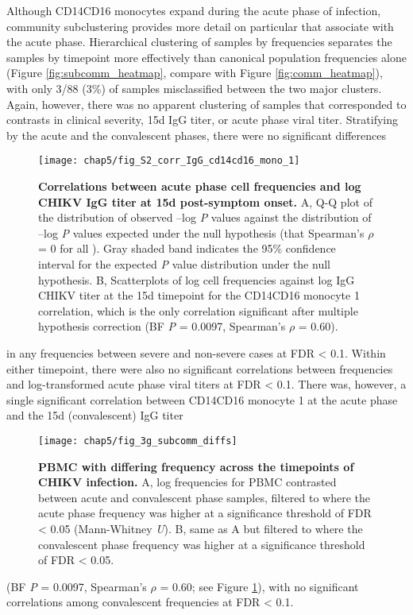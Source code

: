 Although CD14\sups{+}\allowbreak CD16\sups{+} monocytes expand during the acute phase of infection, community subclustering provides more detail on particular \subcommunities{} that associate with the acute phase. Hierarchical clustering of samples by \subcommunity{} frequencies separates the samples by timepoint more effectively than canonical population frequencies alone (Figure \ref{fig:subcomm_heatmap}, compare with Figure \ref{fig:comm_heatmap}), with only 3/88 (3\%) of samples misclassified between the two major clusters. Again, however, there was no apparent clustering of samples that corresponded to contrasts in clinical severity, 15d IgG titer, or acute phase viral titer. Stratifying by the acute and the convalescent phases, there were no significant differences
\begin{figure}[tb]
  \centering
  \texttt{[image: chap5/fig\_S2\_corr\_IgG\_cd14cd16\_mono\_1]}
  \caption[Correlations between acute phase cell \subcommunity{} frequencies and 15d CHIKV IgG titer]{
  \textbf{Correlations between acute phase cell \subcommunity{} frequencies and log CHIKV IgG titer at 15d post-symptom onset.} A, Q-Q plot of the distribution of observed –log \emph{P} values against the distribution of –log \emph{P} values expected under the null hypothesis (that Spearman’s $\rho$ = 0 for all \subcommunities). Gray shaded band indicates the 95\% confidence interval for the expected \emph{P} value distribution under the null hypothesis. B, Scatterplots of log cell \subcommunity{} frequencies against log IgG CHIKV titer at the 15d timepoint for the CD14\sups{+}CD16\sups{+} monocyte 1 correlation, which is the only correlation significant after multiple hypothesis correction (BF \emph{P} = 0.0097, Spearman’s $\rho$ = 0.60).
  }
  \label{fig:corr_cytof_igg}
\end{figure}
in any \subcommunity{} frequencies between severe and non-severe cases at FDR < 0.1. Within either timepoint, there were also no significant correlations between \subcommunity{} frequencies and log-transformed acute phase viral titers at FDR < 0.1. There was, however, a single significant correlation between CD14\sups{+}\allowbreak CD16\sups{+} monocyte \subcommunity{} 1 at the acute phase and the 15d (convalescent) IgG titer
\begin{figure*}[htb]
  \centering
  \texttt{[image: chap5/fig\_3g\_subcomm\_diffs]}
  \caption[PBMC \subcommunities{} with differing frequency across the CHIKV infection phases]{
  \textbf{PBMC \subcommunities{} with differing frequency across the timepoints of CHIKV infection.} A, log frequencies for PBMC \subcommunities{} contrasted between acute and convalescent phase samples, filtered to \subcommunities{} where the acute phase frequency was higher at a significance threshold of FDR < 0.05 (Mann-Whitney \emph{U}). B, same as A but filtered to \subcommunities{} where the convalescent phase frequency was higher at a significance threshold of FDR < 0.05.
  }
  \label{fig:subcomm_diffs}
\end{figure*}
(BF \emph{P} = 0.0097, Spearman’s $\rho$ = 0.60; see Figure \ref{fig:corr_cytof_igg}), with no significant correlations among convalescent \subcommunity{} frequencies at FDR < 0.1.

